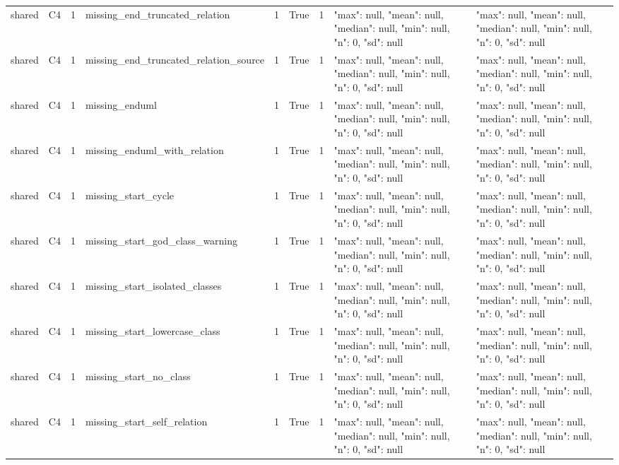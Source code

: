 \begin{tabular}{lllllllll}
shared & C4 & 1 & missing\_end\_truncated\_relation & 1 & True & 1 & {"max": null, "mean": null, "median": null, "min": null, "n": 0, "sd": null} & {"max": null, "mean": null, "median": null, "min": null, "n": 0, "sd": null} \\
shared & C4 & 1 & missing\_end\_truncated\_relation\_source & 1 & True & 1 & {"max": null, "mean": null, "median": null, "min": null, "n": 0, "sd": null} & {"max": null, "mean": null, "median": null, "min": null, "n": 0, "sd": null} \\
shared & C4 & 1 & missing\_enduml & 1 & True & 1 & {"max": null, "mean": null, "median": null, "min": null, "n": 0, "sd": null} & {"max": null, "mean": null, "median": null, "min": null, "n": 0, "sd": null} \\
shared & C4 & 1 & missing\_enduml\_with\_relation & 1 & True & 1 & {"max": null, "mean": null, "median": null, "min": null, "n": 0, "sd": null} & {"max": null, "mean": null, "median": null, "min": null, "n": 0, "sd": null} \\
shared & C4 & 1 & missing\_start\_cycle & 1 & True & 1 & {"max": null, "mean": null, "median": null, "min": null, "n": 0, "sd": null} & {"max": null, "mean": null, "median": null, "min": null, "n": 0, "sd": null} \\
shared & C4 & 1 & missing\_start\_god\_class\_warning & 1 & True & 1 & {"max": null, "mean": null, "median": null, "min": null, "n": 0, "sd": null} & {"max": null, "mean": null, "median": null, "min": null, "n": 0, "sd": null} \\
shared & C4 & 1 & missing\_start\_isolated\_classes & 1 & True & 1 & {"max": null, "mean": null, "median": null, "min": null, "n": 0, "sd": null} & {"max": null, "mean": null, "median": null, "min": null, "n": 0, "sd": null} \\
shared & C4 & 1 & missing\_start\_lowercase\_class & 1 & True & 1 & {"max": null, "mean": null, "median": null, "min": null, "n": 0, "sd": null} & {"max": null, "mean": null, "median": null, "min": null, "n": 0, "sd": null} \\
shared & C4 & 1 & missing\_start\_no\_class & 1 & True & 1 & {"max": null, "mean": null, "median": null, "min": null, "n": 0, "sd": null} & {"max": null, "mean": null, "median": null, "min": null, "n": 0, "sd": null} \\
shared & C4 & 1 & missing\_start\_self\_relation & 1 & True & 1 & {"max": null, "mean": null, "median": null, "min": null, "n": 0, "sd": null} & {"max": null, "mean": null, "median": null, "min": null, "n": 0, "sd": null} \\

\end{tabular}

